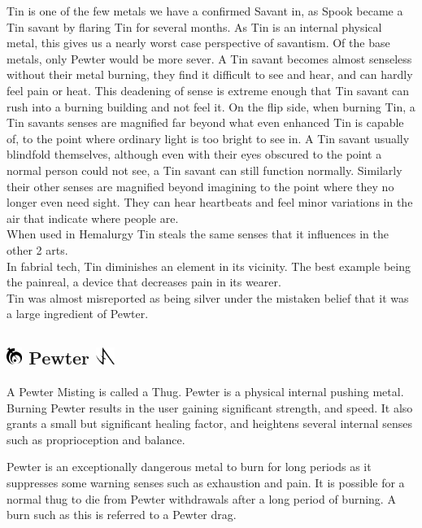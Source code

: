 \documentclass[conference]{IEEEtran}
\begin{document}
Tin is one of the few metals we have a confirmed Savant in, as Spook became a Tin savant by flaring Tin for several months.  As Tin is an internal physical metal, this gives us a nearly worst case perspective of savantism.  Of the base metals, only Pewter would be more sever.  A Tin savant becomes almost senseless without their metal burning, they find it difficult to see and hear, and can hardly feel pain or heat.  This deadening of sense is extreme enough that Tin savant can rush into a burning building and not feel it.  On the flip side, when burning Tin, a Tin savants senses are magnified far beyond what even enhanced Tin is capable of, to the point where ordinary light is too bright to see in.  A Tin savant usually blindfold themselves, although even with their eyes obscured to the point a normal person could not see, a Tin savant can still function normally.  Similarly their other senses are magnified beyond imagining to the point where they no longer even need sight.  They can hear heartbeats and feel minor variations in the air that indicate where people are.\\

When used in Hemalurgy Tin steals the same senses that it influences in the other 2 arts.\\

In fabrial tech, Tin diminishes an element in its vicinity.  The best example being the painreal, a device that decreases pain in its wearer.\\

Tin was almost misreported as being silver under the mistaken belief that it was a large ingredient of Pewter.  
\subsection*{\includegraphics[height=1em]{images/Pewter.png}  Pewter \includegraphics[height=1em]{images/Pewter_(Feruchemy).png}}
A Pewter Misting is called a Thug.  Pewter is a physical internal pushing metal.  Burning Pewter results in the user gaining significant strength, and speed.  It also grants a small but significant healing factor, and heightens several internal senses such as proprioception and balance. 

Pewter is an exceptionally dangerous metal to burn for long periods as it suppresses some warning senses such as exhaustion and pain.  It is possible for a normal thug to die from Pewter withdrawals after a long period of burning.  A burn such as this is referred to a Pewter drag.\\
\end{document}
